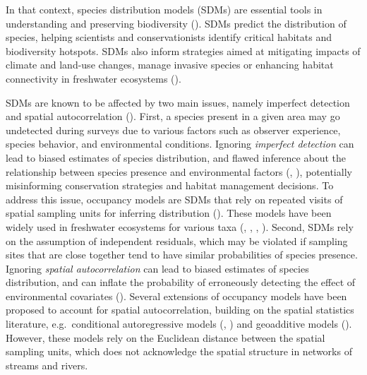 \documentclass[
  11pt,
  a4paper,
]{article}
\begin{document}
In that context, species distribution models (SDMs) are essential tools in understanding and preserving biodiversity (). SDMs predict the distribution of species, helping scientists and conservationists identify critical habitats and biodiversity hotspots. SDMs also inform strategies aimed at mitigating impacts of climate and land-use changes, manage invasive species or enhancing habitat connectivity in freshwater ecosystems ().

SDMs are known to be affected by two main issues, namely imperfect detection and spatial autocorrelation (). First, a species present in a given area may go undetected during surveys due to various factors such as observer experience, species behavior, and environmental conditions. Ignoring \emph{imperfect detection} can lead to biased estimates of species distribution, and flawed inference about the relationship between species presence and environmental factors (, ), potentially misinforming conservation strategies and habitat management decisions. To address this issue, occupancy models are SDMs that rely on repeated visits of spatial sampling units for inferring distribution (). These models have been widely used in freshwater ecosystems for various taxa (, , , ). Second, SDMs rely on the assumption of independent residuals, which may be violated if sampling sites that are close together tend to have similar probabilities of species presence. Ignoring \emph{spatial autocorrelation} can lead to biased estimates of species distribution, and can inflate the probability of erroneously detecting the effect of environmental covariates (). Several extensions of occupancy models have been proposed to account for spatial autocorrelation, building on the spatial statistics literature, e.g.~conditional autoregressive models (, ) and geoadditive models (). However, these models rely on the Euclidean distance between the spatial sampling units, which does not acknowledge the spatial structure in networks of streams and rivers.
\end{document}
